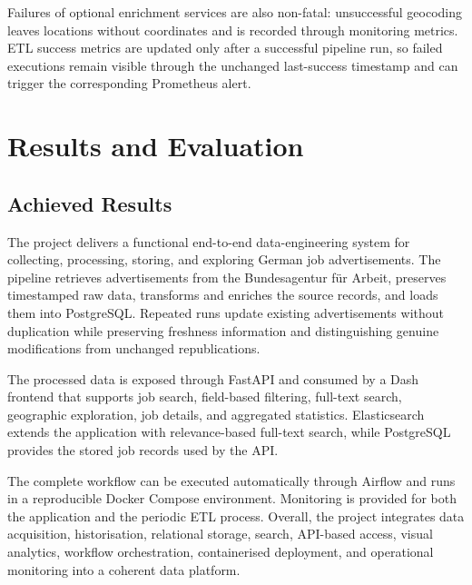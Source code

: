 \documentclass[11pt,a4paper]{article}
\begin{document}
Failures of optional enrichment services are also non-fatal: unsuccessful geocoding leaves locations without coordinates and is recorded through monitoring metrics. ETL success metrics are updated only after a successful pipeline run, so failed executions remain visible through the unchanged last-success timestamp and can trigger the corresponding Prometheus alert.






\section{Results and Evaluation}


\subsection{Achieved Results}

The project delivers a functional end-to-end data-engineering system for collecting, processing, storing, and exploring German job advertisements. The pipeline retrieves advertisements from the Bundesagentur für Arbeit, preserves timestamped raw data, transforms and enriches the source records, and loads them into PostgreSQL. Repeated runs update existing advertisements without duplication while preserving freshness information and distinguishing genuine modifications from unchanged republications.

The processed data is exposed through FastAPI and consumed by a Dash frontend that supports job search, field-based filtering, full-text search, geographic exploration, job details, and aggregated statistics. Elasticsearch extends the application with relevance-based full-text search, while PostgreSQL provides the stored job records used by the API.

The complete workflow can be executed automatically through Airflow and runs in a reproducible Docker Compose environment. Monitoring is provided for both the application and the periodic ETL process. Overall, the project integrates data acquisition, historisation, relational storage, search, API-based access, visual analytics, workflow orchestration, containerised deployment, and operational monitoring into a coherent data platform.
\end{document}
